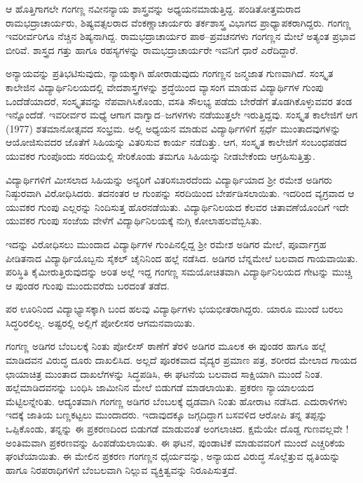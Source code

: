 ಆ ಹೊತ್ತಿಗಾಗಲೇ ಗಂಗಣ್ಣ ನವೀನನ್ಯಾಯ ಶಾಸ್ತ್ರವನ್ನು ಅಧ್ಯಯನಮಾಡುತ್ತಿದ್ದ. ಪಂಡಿತೋತ್ತಮರಾದ ರಾಮಭದ್ರಾಚಾರ್ಯರು, ಶಿಷ್ಯವತ್ಸಲರಾದ ವೆಂಕಣ್ಣಾಚಾರ್ಯರು ತರ್ಕಶಾಸ್ತ್ರ ವಿಭಾಗದ ಪ್ರಾಧ್ಯಾಪಕರಾಗಿದ್ದರು. ಗಂಗಣ್ಣ ಇವರೀರ್ವರಿಗೂ ನೆಚ್ಚಿನ ಶಿಷ್ಯನಾಗಿದ್ದ. ರಾಮಭದ್ರಾಚಾರ್ಯರ ಪಾಠ–ಪ್ರವಚನಗಳು ಗಂಗಣ್ಣನ ಮೇಲೆ ಅತ್ಯಂತ ಪ್ರಭಾವ ಬೀರಿವೆ. ಶಾಸ್ತ್ರದ ಗತ್ತು ಹಾಗೂ ರಹಸ್ಯಗಳನ್ನು ರಾಮಭದ್ರಾಚಾರ್ಯರೇ ಇವನಿಗೆ ಧಾರೆ ಎರೆದಿದ್ದಾರೆ.

ಅನ್ಯಾಯವನ್ನು ಪ್ರತಿಭಟಿಸುವುದು, ನ್ಯಾಯಕ್ಕಾಗಿ ಹೋರಾಡುವುದು ಗಂಗಣ್ಣನ ಜನ್ಮಜಾತ ಗುಣವಾಗಿದೆ. ಸಂಸ್ಕೃತ ಕಾಲೇಜಿನ ವಿದ್ಯಾರ್ಥಿನಿಲಯದಲ್ಲಿ ವೇದಶಾಸ್ತ್ರಗಳನ್ನು ಶ್ರದ್ಧೆಯಿಂದ ವ್ಯಾಸಂಗ ಮಾಡುವ ವಿದ್ಯಾರ್ಥಿಗಳ ಗುಂಪು ಒಂದೆಡೆಯಾದರೆ, ಸಂಸ್ಕೃತವನ್ನು ನೆಪವಾಗಿಸಿಕೊಂಡು, ವಸತಿ ಸೌಲಭ್ಯ ಪಡೆದು ಬೇರೆಡೆಗೆ ತೊಡಗಿಕೊಳ್ಳುವವರ ತಂಡ ಇನ್ನೊಂದೆಡೆ. ಇವರೀರ್ವರ ಮಧ್ಯೆ ಆಗಾಗ ವಾಗ್ವಾದ–ಜಗಳಗಳು ನಡೆಯುತ್ತಲೇ ಇರುತ್ತಿದ್ದವು. ಸಂಸ್ಕೃತ ಕಾಲೇಜಿಗೆ ಆಗ (1977) ಶತಮಾನೋತ್ಸವದ ಸಂಭ್ರಮ. ಅಲ್ಲಿ ಅಧ್ಯಯನ ಮಾಡುವ ವಿದ್ಯಾರ್ಥಿಗಳಿಗೆ ಸ್ಪರ್ಧೆ ಮುಂತಾದವುಗಳನ್ನು ಆಯೋಜಿಸುವದರ ಜೊತೆಗೆ ಸಿಹಿಯನ್ನು ವಿತರಿಸುವ ಕಾರ್ಯ ನಡೆದಿತ್ತು. ಆಗ, ಸಂಸ್ಕೃತ ಕಾಲೇಜಿಗೆ ಸಂಬಂಧಪಡದ ಯುವಕರ ಗುಂಪೊಂದು ಸರದಿಯಲ್ಲಿ ಸೇರಿಕೊಂಡು ತಮಗೂ ಸಿಹಿಯನ್ನು ನೀಡಬೇಕೆಂದು ಆಗ್ರಹಿಸುತ್ತಿತ್ತು.

ವಿದ್ಯಾರ್ಥಿಗಳಿಗೆ ಮೀಸಲಾದ ಸಿಹಿಯನ್ನು ಅನ್ಯರಿಗೆ ವಿತರಿಸಬಾರದೆಂದು ವಿದ್ಯಾರ್ಥಿಯಾದ ಶ್ರೀ ರಮೇಶ ಅಡಿಗರು ನಿಷ್ಠುರವಾಗಿ ವಿರೋಧಿಸಿದರು. ತದನಂತರ ಆ ಗುಂಪನ್ನು ಸರದಿಯಿಂದ ಬೇರ್ಪಡಿಸಲಾಯಿತು. ಇದರಿಂದ ವ್ಯಗ್ರವಾದ ಆ ಯುವಕರ ಗುಂಪು ಎಲ್ಲರನ್ನು ನಿಂದಿಸುತ್ತ ಹೊರನಡೆಯಿತು. ವಿದ್ಯಾರ್ಥಿನಿಲಯದ ಕೆಲವರ ಚಿತಾವಣೆಯೊಂದಿಗೆ ಇದೇ ಯುವಕರ ಗುಂಪು ಸಂಜೆಯ ವೇಳೆಗೆ ವಿದ್ಯಾರ್ಥಿನಿಲಯಕ್ಕೆ ನುಗ್ಗಿ ಕೋಲಾಹಲವೆಬ್ಬಿಸಿತು. 

ಇದನ್ನು ವಿರೋಧಿಸಲು ಮುಂದಾದ ವಿದ್ಯಾರ್ಥಿಗಳ ಗುಂಪಿನಲ್ಲಿದ್ದ ಶ್ರೀ ರಮೇಶ ಅಡಿಗರ ಮೇಲೆ, ಪೂರ್ವಾಗ್ರಹ ಪೀಡಿತನಾದ ವಿದ್ಯಾರ್ಥಿಯೊಬ್ಬನು ಸೈಕಲ್ ಚೈನಿನಿಂದ ಹಲ್ಲೆ ನಡೆಸಿದ. ಅಡಿಗರ ಬೆನ್ನಮೇಲೆ ಬಲವಾದ ಗಾಯವಾಯಿತು. ಪರಿಸ್ಥಿತಿ ಕೈಮೀರುತ್ತಿರುವುದನ್ನು ಅರಿತ ಅಲ್ಲೆ ಇದ್ದ ಗಂಗಣ್ಣ ಸಮಯೋಚಿತವಾಗಿ ವಿದ್ಯಾರ್ಥಿನಿಲಯದ ಗೇಟನ್ನು ಮುಚ್ಚಿ ಆ ಪುಂಡರ ಗುಂಪು ಮುಂದುವರೆದು ಬರದಂತೆ ತಡೆದ.

ಪರ ಊರಿನಿಂದ ವಿದ್ಯಾಭ್ಯಾಸಕ್ಕಾಗಿ ಬಂದ ಹಲವು ವಿದ್ಯಾರ್ಥಿಗಳು ಭಯಭೀತರಾಗಿದ್ದರು. ಯಾರೂ ಮುಂದೆ ಬರಲು ಸಿದ್ಧರಿರಲಿಲ್ಲ. ಅಷ್ಟರಲ್ಲಿ ಅಲ್ಲಿಗೆ ಪೋಲೀಸರ ಆಗಮನವಾಯಿತು. 

ಗಂಗಣ್ಣ ಅಡಿಗರ ಬೆಂಬಲಕ್ಕೆ ನಿಂತು ಪೋಲೀಸ್ ಠಾಣೆಗೆ ತೆರಳಿ ಅಡಿಗರ ಮೂಲಕ ಈ ಪುಂಡರ ಹಾಗೂ ಹಲ್ಲೆ ಮಾಡಿದವನ ವಿರುದ್ಧ ದೂರು ದಾಖಲಿಸಿದ. ಅಲ್ಲದೆ ಪೂರಕವಾದ ವೈದ್ಯರ ಪ್ರಮಾಣ ಪತ್ರ, ಶರೀರದ ಮೇಲಾದ ಗಾಯದ ಛಾಯಾಚಿತ್ರ ಮುಂತಾದ ದಾಖಲೆಗಳನ್ನು ಸಿದ್ಧಪಡಿಸಿ, ಈ ಘಟನೆಯ ಬಲವಾದ ಸಾಕ್ಷಿಯಾಗಿ ಮುಂದೆ ನಿಂತ. ಹಲ್ಲೆಮಾಡಿದವನನ್ನು ಬಂಧಿಸಿ ಜಾಮೀನಿನ ಮೇಲೆ ಬಿಡುಗಡೆ ಮಾಡಲಾಯಿತು. ಪ್ರಕರಣ ನ್ಯಾಯಾಲಯದ ಮೆಟ್ಟಿಲನ್ನೇರಿತು. ಆದ್ಯಂತವಾಗಿ ಗಂಗಣ್ಣ ಅಡಿಗರ ಬೆಂಬಲಕ್ಕೆ ಧೃಡವಾಗಿ ನಿಂತು ಹೋರಾಟ ನಡೆಸಿದ. ಎದುರಾಳಿಗಳು ಇದಕ್ಕೆ ಜಾತಿಯ ಬಣ್ಣಕಟ್ಟಲು ಮುಂದಾದರು. ಇದಾವುದಕ್ಕೂ ಜಗ್ಗದಿದ್ದಾಗ ಬಸವಳಿದ ಆರೋಪಿ ತನ್ನ ತಪ್ಪನ್ನು ಒಪ್ಪಿಕೊಂಡು, ತನ್ನನ್ನು ಈ ಪ್ರಕರಣದಿಂದ ಬಿಡುಗಡೆ ಮಾಡುವಂತೆ ಅಂಗಲಾಚಿದ. ಕ್ಷಮೆಯೇ ದೊಡ್ಡ ಗುಣವಲ್ಲವೇ ! ಅಂತಿಮವಾಗಿ ಪ್ರಕರಣವನ್ನು ಹಿಂಪಡೆಯಲಾಯಿತು. ಈ ಘಟನೆ, ಪುಂಡಾಟಿಕೆ ಮಾಡುವವರಿಗೆ ಮುಂದೆ ಎಚ್ಚರಿಕೆಯ ಘಂಟೆಯಾಯಿತು. ಈ ಮೇಲಿನ ಪ್ರಕರಣ ಗಂಗಣ್ಣನ ಧೈರ್ಯವನ್ನು, ಅನ್ಯಾಯದ ವಿರುದ್ಧ ಸೊಲ್ಲೆತ್ತುವ ಧೃತಿಯನ್ನು ಹಾಗೂ ನಿರಪರಾಧಿಗಳಿಗೆ ಬೆಂಬಲವಾಗಿ ನಿಲ್ಲುವ ವ್ಯಕ್ತಿತ್ವವನ್ನು ನಿರೂಪಿಸುತ್ತದೆ.  

